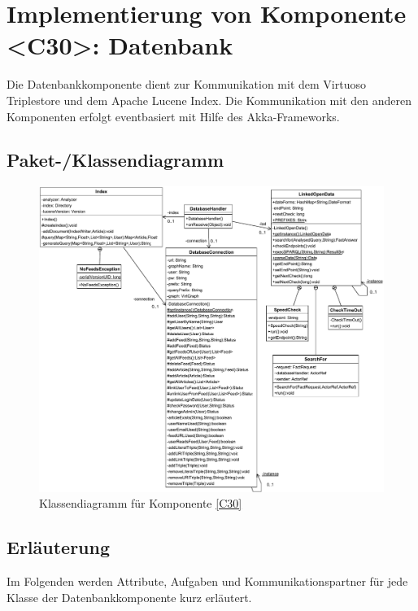 
\section{Implementierung von Komponente <C30>: Datenbank}

Die Datenbankkomponente dient zur Kommunikation mit dem Virtuoso Triplestore und dem Apache Lucene Index. Die Kommunikation mit den anderen Komponenten erfolgt eventbasiert mit Hilfe des Akka-Frameworks.

\subsection{Paket-/Klassendiagramm}

\begin{figure}[ht]
\centering
\includegraphics[width=1.03\textwidth]{Systementwurf/05_implementierungsentwurf/database}
\caption{Klassendiagramm für Komponente \ref{C30}}
\end{figure}

\subsection{Erläuterung}

Im Folgenden werden Attribute, Aufgaben und Kommunikationspartner für jede
Klasse der Datenbankkomponente kurz erläutert.

